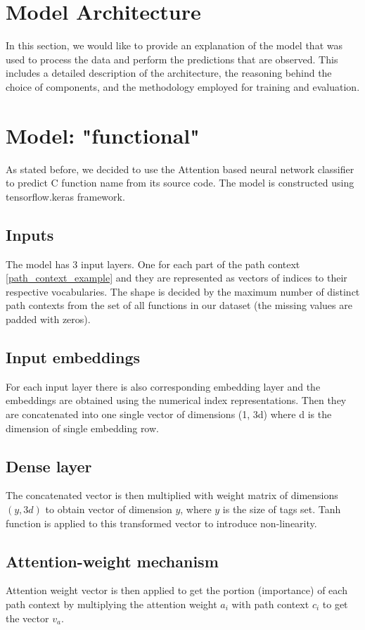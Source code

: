 \documentclass[10pt,english,a4paper]{report}
\begin{document}
\section{Model Architecture}
In this section, we would like to provide an explanation of the model that was used to process the data and perform the predictions that are observed. This includes a detailed description of the architecture, the reasoning behind the choice of components, and the methodology employed for training and evaluation.

\section*{Model: "functional"}
As stated before, we decided to use the Attention based neural network classifier to predict C function name from
its source code. The model is constructed using tensorflow.keras framework.

\subsection{Inputs}
The model has 3 input layers. One for each part of the path context \ref{path_context_example} and they are represented as
vectors of indices to their respective vocabularies. The shape is decided by the maximum
number of distinct path contexts from the set of all functions in our dataset (the missing values are
padded with zeros).

\subsection{Input embeddings}
For each input layer there is also corresponding embedding layer and the embeddings are obtained
using the numerical index representations. Then they are concatenated into one single vector
of dimensions (1, 3d) where d is the dimension of single embedding row.

\subsection{Dense layer}
The concatenated vector is then multiplied with weight matrix of dimensions $(y, 3d)$ to obtain
vector of dimension $y$, where $y$ is the size of tags set. Tanh function is applied to this
transformed vector to introduce non-linearity.

\subsection{Attention-weight mechanism}
Attention weight vector is then applied to get the portion (importance) of each path context
by multiplying the attention weight $a_i$ with path context $c_i$ to get the vector $v_a$.  
\end{document}
